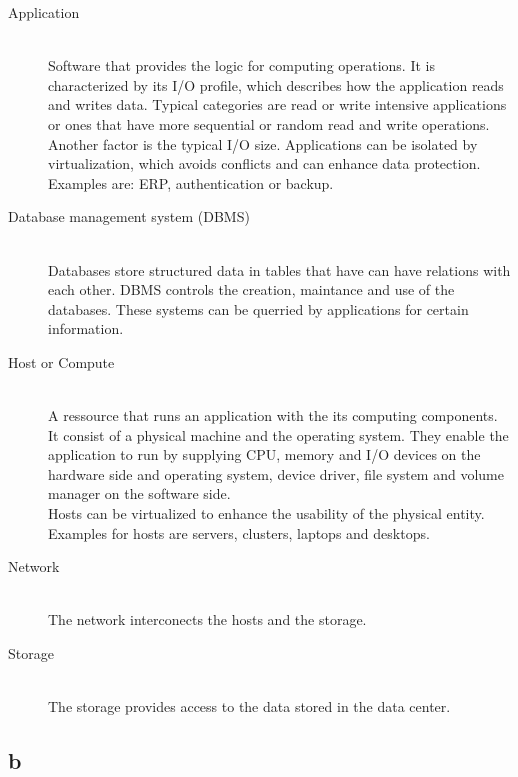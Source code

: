 \documentclass{article}
\begin{document}
	\begin{description}
		\item[Application] \hfill \\
			Software that provides the logic for computing operations.
			It is characterized by its I/O profile,
			which describes how the application reads and writes data.
			Typical categories are read or write intensive applications
			or ones that have more sequential or random read and write operations.
			Another factor is the typical I/O size.
			Applications can be isolated by virtualization,
			which avoids conflicts and can enhance data protection.\\
			Examples are: ERP, authentication or backup.

		\item[Database management system (DBMS)] \hfill \\
			Databases store structured data in tables that have can have relations with each other.
			DBMS controls the creation, maintance and use of the databases.
			These systems can be querried by applications for certain information.
			
		\item[Host or Compute] \hfill \\
			A ressource that runs an application with the its computing components.
			It consist of a physical machine and the operating system.
			They enable the application to run by supplying CPU, memory and I/O devices on the hardware side
			and operating system, device driver, file system and volume manager on the software side.\\
			Hosts can be virtualized to enhance the usability of the physical entity.
			Examples for hosts are servers, clusters, laptops and desktops.

		\item[Network] \hfill \\
			The network interconects the hosts and the storage.

		\item[Storage] \hfill \\
			The storage provides access to the data stored in the data center.
	\end{description}


\subsection*{b}
\end{document}
